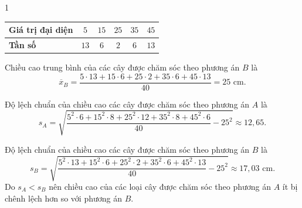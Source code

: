 \begin{ex}
{\begin{enumEX}{1}
\begin{center}
\begin{tabular}{|l|c|c|c|c|c|}
					\hline
					\textbf{Giá trị đại diện}&$5$ & $15$ & $25$ & $35$ & $45$  \\ \hline 
					\textbf{Tần số }&$ 13 $& $6$ & $2$ & $6$ & $13$ \\ 
					\hline \hline
				\end{tabular}
			\end{center}
			Chiều cao trung bình của các cây được chăm sóc theo phương án $B$ là $$\overline{x}_B= \dfrac{5 \cdot 13 + 15 \cdot 6 + 25 \cdot 2 + 35 \cdot 6 + 45 \cdot 13}{40}=25 \text{ cm}.$$
			\item 	Độ lệch chuẩn của chiều cao các cây được chăm sóc theo phương án $A$ là $$s_A =\sqrt{\dfrac{5^2 \cdot 6 + 15^2 \cdot 8 + 25^2 \cdot 12 + 35^2 \cdot 8 + 45 ^2 \cdot 6}{40} - 25^2}\approx 12{,} 65. $$
			\item Độ lệch chuẩn của chiều cao các cây được chăm sóc theo phương án $B$ là $$s_B =\sqrt{\dfrac{5^2 \cdot 13 + 15^2 \cdot 6 + 25^2 \cdot 2 + 35^2 \cdot 6+ 45 ^2 \cdot 13}{40} - 25^2}\approx 17{,} 03 \text{ cm}. $$
			Do $s_A< s_B$ nên chiều cao của các loại cây được chăm sóc theo phương án $A$ ít bị chênh lệch hơn so với phương án $B$.
	\end{enumEX}}
\end{ex}
